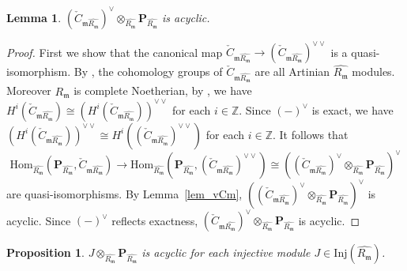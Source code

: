 \documentclass[11pt]{amsart}
\newtheorem{lemma}[theorem]{Lemma}
\newtheorem{proposition}[theorem]{Proposition}
\theoremstyle{remark}
\begin{document}
\begin{lemma}\label{lem_dual_acyclic}
$( \check C_{\mathfrak m \widehat{R_\mathfrak m}})^\vee \otimes_{\widehat{R_\mathfrak m}}\mathbf P_{\widehat{R_\mathfrak m}}$ is acyclic.
\end{lemma}

\begin{proof}
First we show that the canonical map $\check C_{\mathfrak m \widehat{R_\mathfrak m}} \to ( \check C_{\mathfrak m \widehat{R_\mathfrak m}})^{\vee\vee}$ is a quasi-isomorphism. By \cite[Theorem~7.1.3]{brodmann-sharp}, the cohomology groups of $\check C_{\mathfrak m \widehat{R_\mathfrak m}}$ are all Artinian $\widehat{R_\mathfrak m}$ modules. Moreover $\widehat{R_\mathfrak m}$ is complete Noetherian, by \cite[Corollary~4.3(3)]{matlis}, we have $H^i ( \check C_{\mathfrak m \widehat{R_\mathfrak m}}) \cong (H^i( \check C_{\mathfrak m \widehat{R_\mathfrak m}}))^{\vee\vee}$ for each $i\in\mathbb{Z}$. Since $(-)^{\vee}$ is exact, we have $(H^i( \check C_{\mathfrak m \widehat{R_\mathfrak m}}))^{\vee\vee} \cong H^i(( \check C_{\mathfrak m \widehat{R_\mathfrak m}})^{\vee\vee})$ for each $i \in\mathbb{Z}$.
It follows that 
\begin{equation*}
\mathrm{Hom}_{\widehat{R_\mathfrak m}}(\mathbf P_{\widehat{R_\mathfrak m}},  \check C_{\mathfrak m \widehat{R_\mathfrak m}})\longrightarrow
\mathrm{Hom}_{\widehat{R_\mathfrak m}}(\mathbf P_{\widehat{R_\mathfrak m}}, ( \check C_{\mathfrak m \widehat{R_\mathfrak m}})^{\vee\vee})\cong
(( \check C_{\mathfrak m \widehat{R_\mathfrak m}})^\vee \otimes_{\widehat{R_\mathfrak m}} \mathbf P_{\widehat{R_\mathfrak m}})^{\vee}
\end{equation*}
are quasi-isomorphisms. By Lemma~\ref{lem_vCm}, $(( \check C_{\mathfrak m \widehat{R_\mathfrak m}})^\vee \otimes_{\widehat{R_\mathfrak m}} \mathbf P_{\widehat{R_\mathfrak m}})^{\vee}$ is acyclic. Since $(-)^\vee$ reflects exactness, $( \check C_{\mathfrak m \widehat{R_\mathfrak m}})^\vee \otimes_{\widehat{R_\mathfrak m}} \mathbf P_{\widehat{R_\mathfrak m}}$ is acyclic.
\end{proof}

\begin{proposition}\label{prop_key}
$J\otimes_{\widehat{R_\mathfrak m}}\mathbf P_{\widehat{R_\mathfrak m}}$ is acyclic for each injective module $J \in \mathrm{Inj}(\widehat{R_\mathfrak m})$.
\end{proposition}
\end{document}

